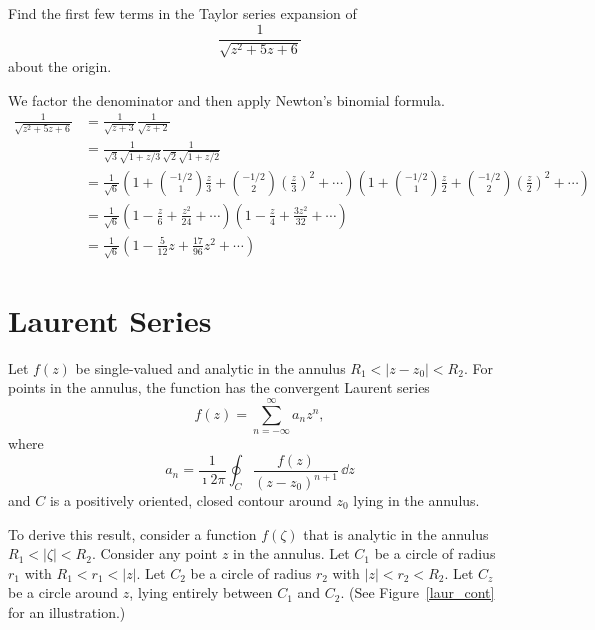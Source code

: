 \begin{Example}
  Find the first few terms in the Taylor series expansion of
  \[
  \frac{1}{\sqrt{z^2 + 5 z + 6}}
  \]
  about the origin.

  We factor the denominator and then apply Newton's binomial formula.
  \begin{align*}
    \frac{1}{\sqrt{z^2 + 5 z + 6}}
    &= \frac{1}{\sqrt{z + 3}} \frac{1}{\sqrt{z + 2}} 
    \\
    &= \frac{1}{\sqrt{3} \sqrt{1 + z/3}} \frac{1}{\sqrt{2} \sqrt{1+z/2}} 
    \\
    &= \frac{1}{\sqrt{6}} \left( 1 + \binom{-1/2}{1} \frac{z}{3}
      + \binom{-1/2}{2} \left(\frac{z}{3}\right)^2 + \cdots \right)
    \left( 1 + \binom{-1/2}{1} \frac{z}{2}
      + \binom{-1/2}{2} \left(\frac{z}{2}\right)^2 + \cdots \right)
    \\
    &= \frac{1}{\sqrt{6}} \left( 1 - \frac{z}{6} + \frac{z^2}{24} + \cdots
    \right)
    \left( 1 - \frac{z}{4} + \frac{3 z^2}{32} + \cdots \right) 
    \\
    &= \frac{1}{\sqrt{6}} \left( 1 - \frac{5}{12} z + \frac{17}{96} z^2
      + \cdots \right)
  \end{align*}
\end{Example}













\section{Laurent Series}

\begin{Result}
  Let $f(z)$ be single-valued and analytic in the annulus 
  $R_1 < |z - z_0| < R_2$.  For points in the annulus, the function
  has the convergent Laurent series
  \[ 
  f(z) = \sum_{n = -\infty}^\infty a_n z^n,
  \]
  where 
  \[ 
  a_n = \frac{1}{\imath 2 \pi} \oint_C \frac{f(z)}{(z - z_0)^{n+1}}\,\dd z 
  \]
  and $C$ is a positively oriented, closed contour around $z_0$ 
  lying in the annulus.
\end{Result}



To derive this result, consider a function $f(\zeta)$ that is analytic in the 
annulus $R_1 < |\zeta| < R_2$.  Consider any point $z$ in the annulus.
Let $C_1$ be a circle of radius $r_1$ with
$R_1 < r_1 < |z|$.  Let $C_2$ be a circle of radius $r_2$ with
$|z| < r_2 < R_2$. 
Let $C_z$ be a circle around $z$, lying entirely between $C_1$ and $C_2$.
(See Figure~\ref{laur_cont} for an illustration.)

